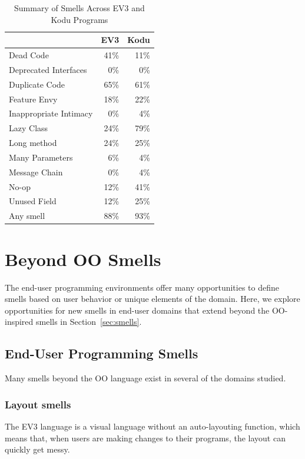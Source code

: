 \documentclass{sig-alternate}
\begin{document}
\begin{table}
\caption{Summary of Smells Across EV3 and Kodu Programs \label{tab:smellsummary}}
\begin{small}
\begin{center}
\begin{tabular}{l | r r}
&EV3&Kodu\\ \hline
Dead Code&41\%&11\%\\
Deprecated Interfaces & 0\% & 0\%\\
Duplicate Code&65\%&61\%\\
Feature Envy&18\%&22\%\\
Inappropriate Intimacy&0\%&4\%\\
Lazy Class&24\%&79\%\\
Long method&24\%&25\%\\
Many Parameters&6\%&4\%\\
Message Chain&0\%&4\%\\
No-op&12\%&41\%\\
Unused Field&12\%&25\%\\ \hline
Any smell & 88\% & 93\%
\end{tabular}
\end{center}
\end{small}
\end{table}

\section{Beyond OO Smells}
\label{sec:beyond}

\label{sec:smells:domain}
The end-user programming environments offer many opportunities to define smells based on user behavior or unique elements of the domain. Here, we explore opportunities for new smells in end-user domains that extend beyond the OO-inspired smells in Section~\ref{sec:smells}. 

\subsection{End-User Programming Smells}
Many smells beyond the OO language exist in several of the domains studied. 

\subsubsection{Layout smells}
The EV3 language is a visual language without an auto-layouting function, which means that, when users are making changes to their programs, the layout can quickly get messy. 
\end{document}
